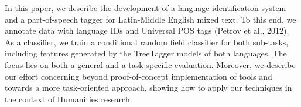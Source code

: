 In this paper, we describe the development of a language identification system and a part-of-speech tagger for Latin-Middle English mixed text. To this end, we annotate data with language IDs and Universal POS tags (Petrov et al., 2012). As a classifier, we train a conditional random field classifier for both sub-tasks, including features generated by the TreeTagger models of both languages. The focus lies on both a general and a task-specific evaluation. Moreover, we describe our effort concerning beyond proof-of-concept implementation of tools and towards a more task-oriented approach, showing how to apply our techniques in the context of Humanities research.
